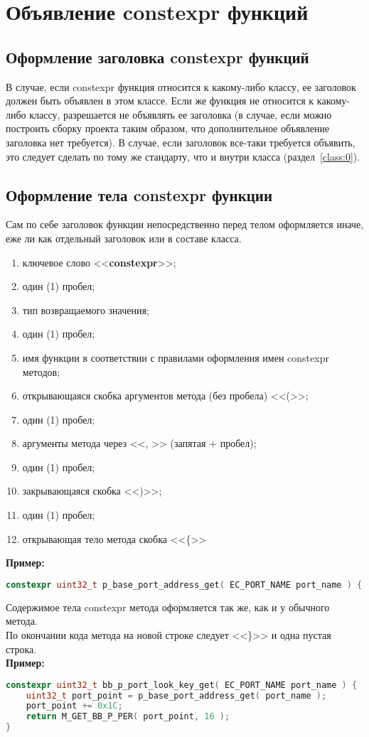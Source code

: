 \chapter{Объявление constexpr функций}\label{const:func}
\section{Оформление заголовка constexpr функций}
В случае, если constexpr функция относится к какому-либо классу, ее заголовок должен быть объявлен в этом классе. Если же функция не относится к какому-либо классу, разрешается не объявлять ее заголовка (в случае, если можно построить сборку проекта таким образом, что дополнительное объявление заголовка нет требуется). В случае, если заголовок все-таки требуется объявить, это следует сделать по тому же стандарту, что и внутри класса (раздел~\ref{class:0}).

\section{Оформление тела constexpr функции}
Сам по себе заголовок функции непосредственно перед телом оформляется иначе, еже ли как отдельный заголовок или в составе класса.
\begin{enumerate}
	\item ключевое слово <<\textbf{constexpr}>>;
	\item один (1) пробел;
	\item тип возвращаемого значения;
	\item один (1) пробел;
	\item имя функции в соответствии с правилами оформления имен constexpr методов;
	\item открывающаяся скобка аргументов метода (без пробела) <<(>>;
	\item один (1) пробел;
	\item аргументы метода через <<, >> (запятая + пробел);
	\item один (1) пробел;
	\item закрывающаяся скобка <<)>>;
	\item один (1) пробел;
	\item открывающая тело метода скобка <<\{>>
\end{enumerate}
\textbf{Пример:}\begin{lstlisting}[language=C++, frame=tlBR, basicstyle=\fontsize{10}{10}\ttfamily]
constexpr uint32_t p_base_port_address_get( EC_PORT_NAME port_name ) {\end{lstlisting}
Содержимое тела constexpr метода оформляется так же, как и у обычного метода.\\По окончании кода метода на новой строке следует <<\}>> и одна пустая строка.
\\\textbf{Пример:}\begin{lstlisting}[language=C++, frame=tlBR, basicstyle=\fontsize{10}{10}\ttfamily]
constexpr uint32_t bb_p_port_look_key_get( EC_PORT_NAME port_name ) {
	uint32_t port_point = p_base_port_address_get( port_name ); 
	port_point += 0x1C;                                         
	return M_GET_BB_P_PER( port_point, 16 );                    
}
 \end{lstlisting}
